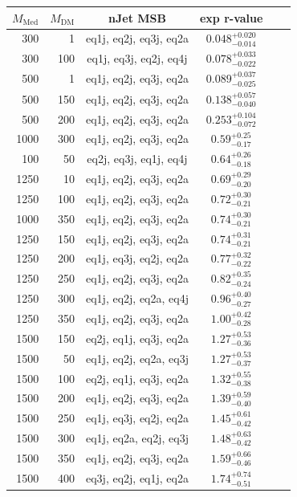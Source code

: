 \begin{table}
  \centering
  \begin{tabular}{rrcccc}
    \hline\hline
    $M_{\text{Med}}$ & $M_{\text{DM}}$ & nJet MSB & exp r-value \\
    \hline
  300 &   1 & eq1j, eq2j, eq3j, eq2a & $0.048_{-0.014}^{+0.020}$ \\
  300 & 100 & eq1j, eq3j, eq2j, eq4j & $0.078_{-0.022}^{+0.033}$ \\
  500 &   1 & eq1j, eq2j, eq3j, eq2a & $0.089_{-0.025}^{+0.037}$ \\
  500 & 150 & eq1j, eq2j, eq3j, eq2a & $0.138_{-0.040}^{+0.057}$ \\
  500 & 200 & eq1j, eq2j, eq3j, eq2a & $0.253_{-0.072}^{+0.104}$ \\
 1000 & 300 & eq1j, eq2j, eq3j, eq2a & $0.59_{-0.17}^{+0.25}$ \\
  100 &  50 & eq2j, eq3j, eq1j, eq4j & $0.64_{-0.18}^{+0.26}$ \\
 1250 &  10 & eq1j, eq2j, eq3j, eq2a & $0.69_{-0.20}^{+0.29}$ \\
 1250 & 100 & eq1j, eq2j, eq3j, eq2a & $0.72_{-0.21}^{+0.30}$ \\
 1000 & 350 & eq1j, eq2j, eq3j, eq2a & $0.74_{-0.21}^{+0.30}$ \\
 1250 & 150 & eq1j, eq2j, eq3j, eq2a & $0.74_{-0.21}^{+0.31}$ \\
 1250 & 200 & eq1j, eq3j, eq2j, eq2a & $0.77_{-0.22}^{+0.32}$ \\
 1250 & 250 & eq1j, eq2j, eq3j, eq2a & $0.82_{-0.24}^{+0.35}$ \\
 1250 & 300 & eq1j, eq2j, eq2a, eq4j & $0.96_{-0.27}^{+0.40}$ \\
 1250 & 350 & eq1j, eq2j, eq3j, eq2a & $1.00_{-0.28}^{+0.42}$ \\
 1500 & 150 & eq2j, eq1j, eq3j, eq2a & $1.27_{-0.36}^{+0.53}$ \\
 1500 &  50 & eq1j, eq2j, eq2a, eq3j & $1.27_{-0.37}^{+0.53}$ \\
 1500 & 100 & eq2j, eq1j, eq3j, eq2a & $1.32_{-0.38}^{+0.55}$ \\
 1500 & 200 & eq1j, eq2j, eq3j, eq2a & $1.39_{-0.40}^{+0.59}$ \\
 1500 & 250 & eq1j, eq3j, eq2j, eq2a & $1.45_{-0.42}^{+0.61}$ \\
 1500 & 300 & eq1j, eq2a, eq2j, eq3j & $1.48_{-0.42}^{+0.63}$ \\
 1500 & 350 & eq1j, eq2j, eq3j, eq2a & $1.59_{-0.46}^{+0.66}$ \\
 1500 & 400 & eq3j, eq2j, eq1j, eq2a & $1.74_{-0.51}^{+0.74}$ \\


\end{tabular}
\end{table}
